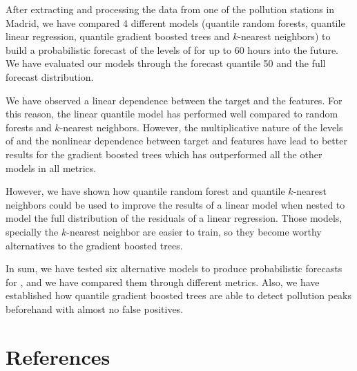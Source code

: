 \documentclass[a4paper,3p,sort&compress]{elsarticle}
\begin{document}
After extracting and processing the data from one of the pollution
stations in Madrid, we have compared 4 different models (quantile
random forests, quantile linear regression, quantile gradient boosted
trees and $k$-nearest neighbors) to build a probabilistic forecast of
the levels of \no for up to 60 hours into the future. We have
evaluated our models through the forecast quantile 50 and the full
forecast distribution.

We have observed a linear dependence between the target and the
features. For this reason, the linear quantile model has performed
well compared to random forests and $k$-nearest neighbors. However,
the multiplicative nature of the levels of \no and the nonlinear
dependence between target and features have lead to better results for
the gradient boosted trees which has outperformed all the other models
in all metrics.

However, we have shown how quantile random forest and quantile
$k$-nearest neighbors could be used to improve the results of a linear
model when nested to model the full distribution of the residuals of a
linear regression. Those models, specially the $k$-nearest neighbor
are easier to train, so they become worthy alternatives to the
gradient boosted trees.

In sum, we have tested six alternative models to produce probabilistic
forecasts for \no, and we have compared them through different
metrics.  Also, we have established how quantile gradient boosted
trees are able to detect pollution peaks beforehand with almost no
false positives.


\section*{References}


\end{document}
